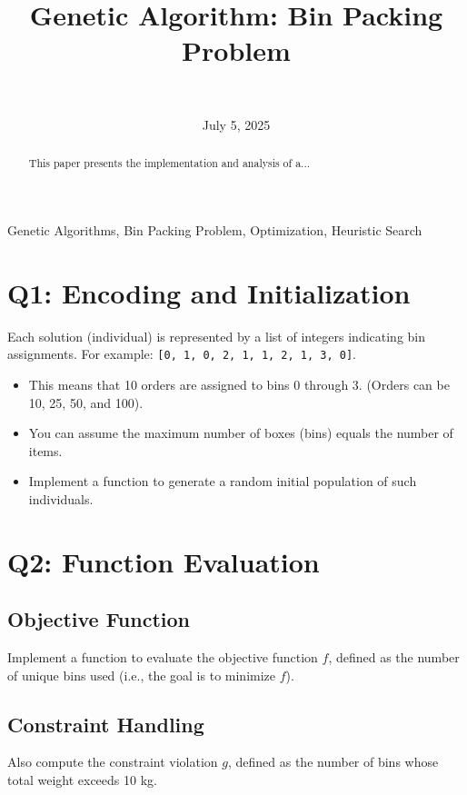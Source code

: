 \documentclass[journal,12pt,onecolumn]{IEEEtran}
\title{Genetic Algorithm: Bin Packing Problem}
\author{
   \IEEEauthorblockN{Matthew D. Branson} \\
   \IEEEauthorblockA{\textit{Department of Computer Science} \\
   \textit{Missouri State University}\\
   Springfield, MO \\
   branson773@live.missouristate.edu
   }
}
\date{July 5, 2025}
\begin{document}
\maketitle

\begin{abstract}
This paper presents the implementation and analysis of a...
\end{abstract}

\begin{IEEEkeywords}
Genetic Algorithms, Bin Packing Problem, Optimization, Heuristic Search
\end{IEEEkeywords}

\section{Q1: Encoding and Initialization}

Each solution (individual) is represented by a list of integers indicating bin assignments. For example: \texttt{[0, 1, 0, 2, 1, 1, 2, 1, 3, 0]}.

\begin{itemize}
    \item This means that 10 orders are assigned to bins 0 through 3. (Orders can be 10, 25, 50, and 100).
    \item You can assume the maximum number of boxes (bins) equals the number of items.
    \item Implement a function to generate a random initial population of such individuals.
\end{itemize}

\section{Q2: Function Evaluation}

\subsection{Objective Function}

Implement a function to evaluate the objective function $f$, defined as the number of unique bins used (i.e., the goal is to minimize $f$).

\subsection{Constraint Handling}

Also compute the constraint violation $g$, defined as the number of bins whose total weight exceeds 10 kg.
\end{document}
